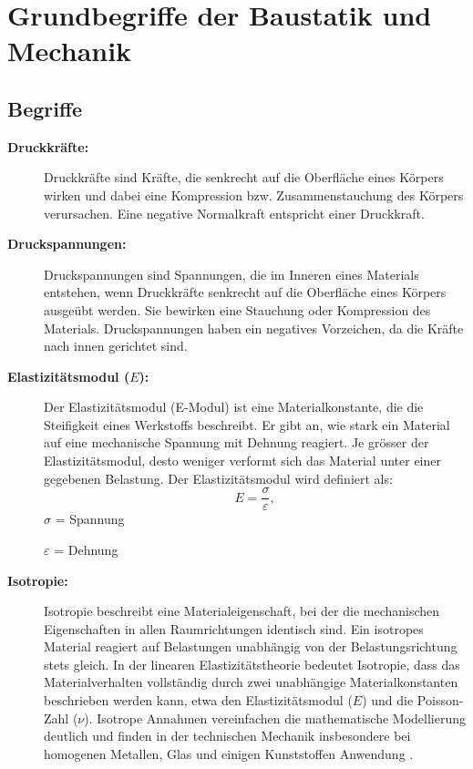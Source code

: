 %
%
%
%
\section{Grundbegriffe der Baustatik und Mechanik}
\label{elastomechanik:section:teil1}
\subsection{Begriffe}
\begin{description}	
	\item[\textbf{Druckkräfte:}] Druckkräfte sind Kräfte, die senkrecht auf die Oberfläche eines Körpers wirken und dabei eine Kompression bzw. Zusammenstauchung des Körpers verursachen. 
	Eine negative Normalkraft entspricht einer Druckkraft.
	
	\item[\textbf{Druckspannungen:}] Druckspannungen sind Spannungen, die im Inneren eines Materials entstehen, wenn Druckkräfte senkrecht auf die Oberfläche eines Körpers ausgeübt werden. 
	Sie bewirken eine Stauchung oder Kompression des Materials.
	Druckspannungen haben ein negatives Vorzeichen, da die Kräfte nach innen gerichtet sind.
	
	\item[\textbf{Elastizitätsmodul ($E$):}] Der Elastizitätsmodul (E-Modul) ist eine Materialkonstante, die die Steifigkeit eines Werkstoffs beschreibt. 
	Er gibt an, wie stark ein Material auf eine mechanische Spannung mit Dehnung reagiert. 
	Je grösser der Elastizitätsmodul, desto weniger verformt sich das Material unter einer gegebenen Belastung.
	Der Elastizitätsmodul wird definiert als:
	\begin{equation}
		E=
		\frac{\sigma}{\varepsilon},
	\end{equation}
	$\sigma$ = Spannung
	
	$\varepsilon$ = Dehnung
	
	\item[\textbf{Isotropie:}] Isotropie beschreibt eine Materialeigenschaft, bei der die mechanischen Eigenschaften in allen Raumrichtungen identisch sind. 
	Ein isotropes Material reagiert auf Belastungen unabhängig von der Belastungsrichtung stets gleich.
	In der linearen Elastizitätstheorie bedeutet Isotropie, dass das Materialverhalten vollständig durch zwei unabhängige Materialkonstanten beschrieben werden kann, etwa den Elastizitätsmodul ($E$) und die Poisson-Zahl ($\nu$).  
	Isotrope Annahmen vereinfachen die mathematische Modellierung deutlich und finden in der technischen Mechanik insbesondere bei homogenen Metallen, Glas und einigen Kunststoffen Anwendung \cite{elastomechanik:Isotropie}.
	

\end{description}
